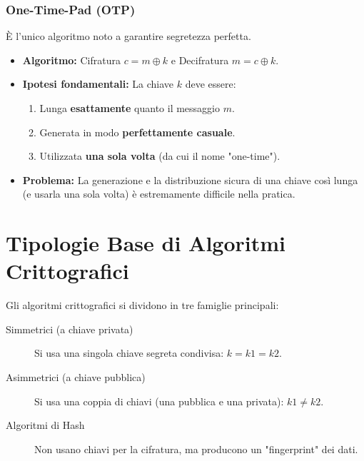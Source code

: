 \documentclass[../main.tex]{subfiles}
\begin{document}
\subsubsection{One-Time-Pad (OTP)}
È l'unico algoritmo noto a garantire segretezza perfetta.
\begin{itemize}
    \item \textbf{Algoritmo:} Cifratura $c = m \oplus k$ e Decifratura $m = c \oplus k$.
    \item \textbf{Ipotesi fondamentali:} La chiave $k$ deve essere:
    \begin{enumerate}
        \item Lunga \textbf{esattamente} quanto il messaggio $m$.
        \item Generata in modo \textbf{perfettamente casuale}.
        \item Utilizzata \textbf{una sola volta} (da cui il nome "one-time").
    \end{enumerate}
    \item \textbf{Problema:} La generazione e la distribuzione sicura di una chiave così lunga (e usarla una sola volta) è estremamente difficile nella pratica.
\end{itemize}


\section{Tipologie Base di Algoritmi Crittografici}
Gli algoritmi crittografici si dividono in tre famiglie principali:
\begin{description}
    \item[Simmetrici (a chiave privata)] Si usa una singola chiave segreta condivisa: $k = k1 = k2$.
    \item[Asimmetrici (a chiave pubblica)] Si usa una coppia di chiavi (una pubblica e una privata): $k1 \ne k2$.
    \item[Algoritmi di Hash] Non usano chiavi per la cifratura, ma producono un "fingerprint" dei dati.
\end{description}

\end{document}
